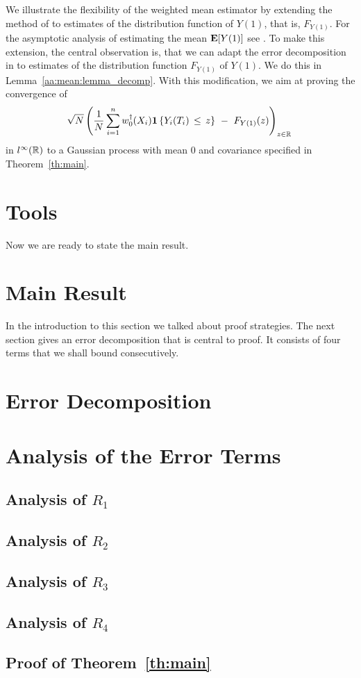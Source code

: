 We illustrate the flexibility of 
the weighted mean estimator by 
extending the method of \cite{Wang2019} to
estimates of 
the distribution function of $Y(1)$, that is, $F_{Y(1)}$.
For the asymptotic analysis of estimating the mean $\mathbf{E}[Y(1)]$ see \cite[Proof of Theorem~3]{Wang2019}.
To make this extension, the central observation is, that we can adapt the error decomposition in \cite[page 27]{Wang2019} 
to estimates of the distribution function $F_{Y(1)}$ of $Y(1)$.
We do this in Lemma~\ref{aa:mean:lemma_decomp}.
With this modification, we aim at proving
the convergence of
\begin{gather*}
    \sqrt{N}
    \left( 
  \frac{1}{N}
    \sum_{i=1}^{n} 
    w_0^\dagger(X_i)
    \mathbf{1}\left\{ Y_i(T_i)\,\le\, z \right\}
    \ 
    -
    \ 
    F_{Y(1)}(z)
    \right)
    _{z\in\R}
    \,
  \end{gather*}
  in
  $l^\infty(\mathbb{R})$
  to a Gaussian process with mean 0 and covariance specified in Theorem~\ref{th:main}.
\section{Tools}
  
Now we are ready to state the main result.
\newpage
\section{Main Result}
  
In the introduction to this section we talked about proof strategies. The next section gives an error decomposition that is central to proof.
It consists of four terms that we shall bound consecutively. 
\section{Error Decomposition}
  
\section{Analysis of the Error Terms}
  \subsection{Analysis of $R_1$}
    
  \subsection{Analysis of $R_2$}
    
  \subsection{Analysis of $R_3$}
    
  \subsection{Analysis of $R_4$}
    
  \subsection{Proof of Theorem~\ref{th:main}}
    
